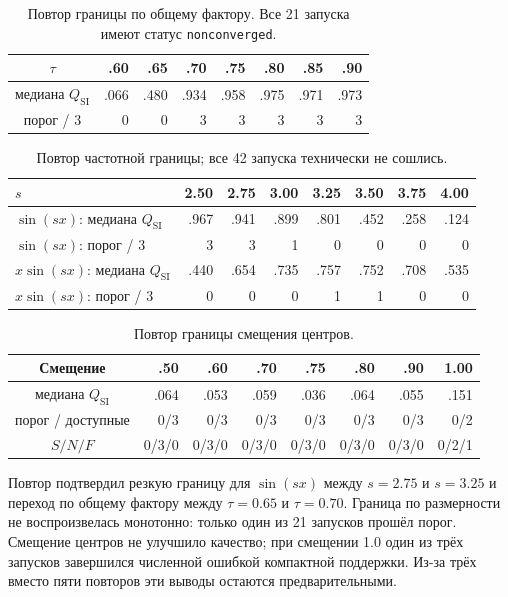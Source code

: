 \documentclass[11pt,a4paper]{article}
\newcommand{\code}[1]{\texttt{#1}}
\newcommand{\qsi}{Q_{\mathrm{SI}}}
\newcommand{\snf}{S/N/F}
\begin{document}
\begin{table}[ht]
\centering
\small
\begin{tabular}{c|rrrrrrr}
\hline
$\tau$ & .60 & .65 & .70 & .75 & .80 & .85 & .90 \\
\hline
медиана $\qsi$ & .066 & .480 & .934 & .958 & .975 & .971 & .973 \\
порог / 3 & 0 & 0 & 3 & 3 & 3 & 3 & 3 \\
\hline
\end{tabular}
\caption{Повтор границы по общему фактору. Все 21 запуска имеют статус
\code{nonconverged}.}
\label{tab:single2-tau}
\end{table}

\begin{table}[ht]
\centering
\small
\begin{tabular}{l|rrrrrrr}
\hline
$s$ & 2.50 & 2.75 & 3.00 & 3.25 & 3.50 & 3.75 & 4.00 \\
\hline
$\sin(sx)$: медиана $\qsi$ & .967 & .941 & .899 & .801 & .452 & .258 & .124 \\
$\sin(sx)$: порог / 3 & 3 & 3 & 1 & 0 & 0 & 0 & 0 \\
$x\sin(sx)$: медиана $\qsi$ & .440 & .654 & .735 & .757 & .752 & .708 & .535 \\
$x\sin(sx)$: порог / 3 & 0 & 0 & 0 & 1 & 1 & 0 & 0 \\
\hline
\end{tabular}
\caption{Повтор частотной границы; все 42 запуска технически не сошлись.}
\label{tab:single2-frequency}
\end{table}

\begin{table}[ht]
\centering
\small
\begin{tabular}{c|rrrrrrr}
\hline
Смещение & .50 & .60 & .70 & .75 & .80 & .90 & 1.00 \\
\hline
медиана $\qsi$ & .064 & .053 & .059 & .036 & .064 & .055 & .151 \\
порог / доступные & 0/3 & 0/3 & 0/3 & 0/3 & 0/3 & 0/3 & 0/2 \\
$\snf$ & 0/3/0 & 0/3/0 & 0/3/0 & 0/3/0 & 0/3/0 & 0/3/0 & 0/2/1 \\
\hline
\end{tabular}
\caption{Повтор границы смещения центров.}
\label{tab:single2-displacement}
\end{table}

Повтор подтвердил резкую границу для $\sin(sx)$ между $s=2.75$ и $s=3.25$
и переход по общему фактору между $\tau=0.65$ и $\tau=0.70$. Граница по
размерности не воспроизвелась монотонно: только один из 21 запусков прошёл
порог. Смещение центров не улучшило качество; при смещении 1.0 один из трёх
запусков завершился численной ошибкой компактной поддержки. Из-за трёх вместо
пяти повторов эти выводы остаются предварительными.
\end{document}

